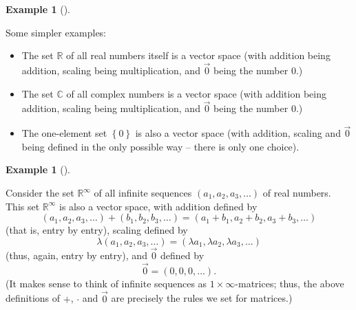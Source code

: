\documentclass[numbers=enddot,12pt,final,onecolumn,notitlepage]{scrartcl}%
\theoremstyle{definition}
\newtheorem{exam}[theo]{Example}
\newenvironment{example}[1][]
{\begin{exam}[#1]\begin{leftbar}}
{\end{leftbar}\end{exam}}
\begin{document}
\begin{example}
\label{exam.vectspace.RC0}Some simpler examples:

\begin{itemize}
\item The set $\mathbb{R}$ of all real numbers itself is a vector space (with
addition being addition, scaling being multiplication, and $\overrightarrow{0}%
$ being the number $0$.)

\item The set $\mathbb{C}$ of all complex numbers is a vector space (with
addition being addition, scaling being multiplication, and $\overrightarrow{0}%
$ being the number $0$.)

\item The one-element set $\left\{  0\right\}  $ is also a vector space (with
addition, scaling and $\overrightarrow{0}$ being defined in the only possible
way -- there is only one choice).
\end{itemize}
\end{example}

\begin{example}
\label{exam.vectspace.Rinf}Consider the set $\mathbb{R}^{\infty}$ of all
infinite sequences $\left(  a_{1},a_{2},a_{3},\ldots\right)  $ of real
numbers. This set $\mathbb{R}^{\infty}$ is also a vector space, with addition
defined by%
\[
\left(  a_{1},a_{2},a_{3},\ldots\right)  +\left(  b_{1},b_{2},b_{3}%
,\ldots\right)  =\left(  a_{1}+b_{1},a_{2}+b_{2},a_{3}+b_{3},\ldots\right)
\]
(that is, entry by entry), scaling defined by%
\[
\lambda\left(  a_{1},a_{2},a_{3},\ldots\right)  =\left(  \lambda a_{1},\lambda
a_{2},\lambda a_{3},\ldots\right)
\]
(thus, again, entry by entry), and $\overrightarrow{0}$ defined by%
\[
\overrightarrow{0}=\left(  0,0,0,\ldots\right)  .
\]
(It makes sense to think of infinite sequences as $1\times\infty$-matrices;
thus, the above definitions of $+$, $\cdot$ and $\overrightarrow{0}$ are
precisely the rules we set for matrices.)
\end{example}
\end{document}
